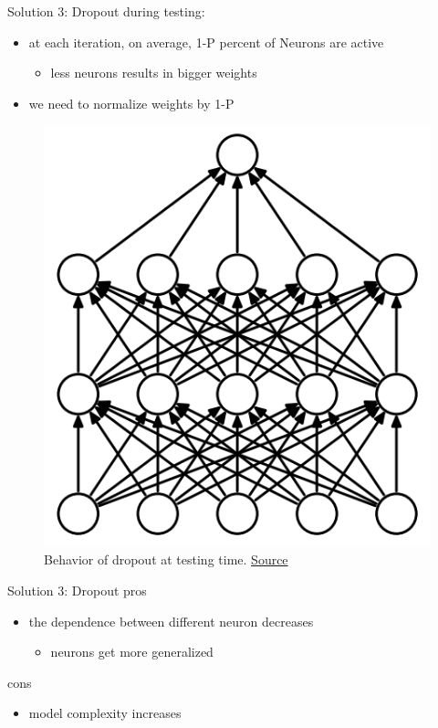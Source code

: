 \begin{frame}{Solution 3: Dropout}
	during testing:
	\begin{itemize}
		\item at each iteration, on average, 1-P percent of Neurons are active
		\begin{itemize}
			\item less neurons results in bigger weights
		\end{itemize}
		\item we need to normalize weights by 1-P
	\end{itemize}
	
	\begin{figure}[H]
		\centering
		\includegraphics[height=0.4\textheight]{Figs/Dropout-before.png}
		\caption{Behavior of dropout at testing time. \href{https://www.cs.toronto.edu/~hinton/absps/JMLRdropout.pdf}{Source}}
	\end{figure}
\end{frame}
\begin{frame}{Solution 3: Dropout}
	pros
	\begin{itemize}
		\item the dependence between different neuron decreases
		\begin{itemize}
			\item neurons get more generalized
		\end{itemize}
	\end{itemize}
	cons
	\begin{itemize}
		\item model complexity increases
	\end{itemize}
\end{frame}
